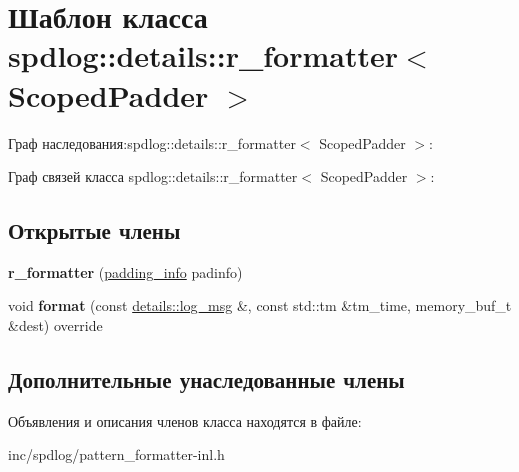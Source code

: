 \hypertarget{classspdlog_1_1details_1_1r__formatter}{}\section{Шаблон класса spdlog\+:\+:details\+:\+:r\+\_\+formatter$<$ Scoped\+Padder $>$}
\label{classspdlog_1_1details_1_1r__formatter}


Граф наследования\+:spdlog\+:\+:details\+:\+:r\+\_\+formatter$<$ Scoped\+Padder $>$\+:


Граф связей класса spdlog\+:\+:details\+:\+:r\+\_\+formatter$<$ Scoped\+Padder $>$\+:
\subsection*{Открытые члены}
\begin{DoxyCompactItemize}
\item 
\mbox{\label{classspdlog_1_1details_1_1r__formatter_a31efe7e794dee64a1edf858840daef0e}} 
{\bfseries r\+\_\+formatter} (\hyperlink{structspdlog_1_1details_1_1padding__info}{padding\+\_\+info} padinfo)
\item 
\mbox{\label{classspdlog_1_1details_1_1r__formatter_a10ae69cf35e258582f1caa005a8617ff}} 
void {\bfseries format} (const \hyperlink{structspdlog_1_1details_1_1log__msg}{details\+::log\+\_\+msg} \&, const std\+::tm \&tm\+\_\+time, memory\+\_\+buf\+\_\+t \&dest) override
\end{DoxyCompactItemize}
\subsection*{Дополнительные унаследованные члены}


Объявления и описания членов класса находятся в файле\+:\begin{DoxyCompactItemize}
\item 
inc/spdlog/pattern\+\_\+formatter-\/inl.\+h\end{DoxyCompactItemize}
